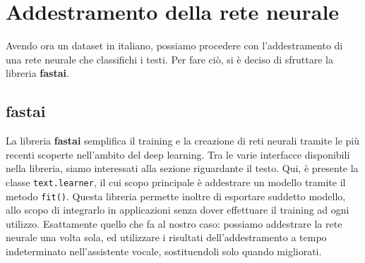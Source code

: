 \section{Addestramento della rete neurale}
Avendo ora un dataset in italiano, possiamo procedere con l'addestramento di una rete neurale che classifichi i testi. Per fare ciò, si è deciso di sfruttare la libreria \textbf{fastai}.
\subsection{fastai}
La libreria \textbf{fastai} semplifica il training e la creazione di reti neurali tramite le più recenti scoperte nell'ambito del deep learning. Tra le varie interfacce disponibili nella libreria, siamo interessati alla sezione riguardante il testo. Qui, è presente la classe \texttt{text.learner}, il cui scopo principale è addestrare un modello tramite il metodo \texttt{fit()}. Questa libreria permette inoltre di esportare suddetto modello, allo scopo di integrarlo in applicazioni senza dover effettuare il training ad ogni utilizzo. Esattamente quello che fa al nostro caso: possiamo addestrare la rete neurale una volta sola, ed utilizzare i risultati dell'addestramento a tempo indeterminato nell'assistente vocale, sostituendoli solo quando migliorati.

